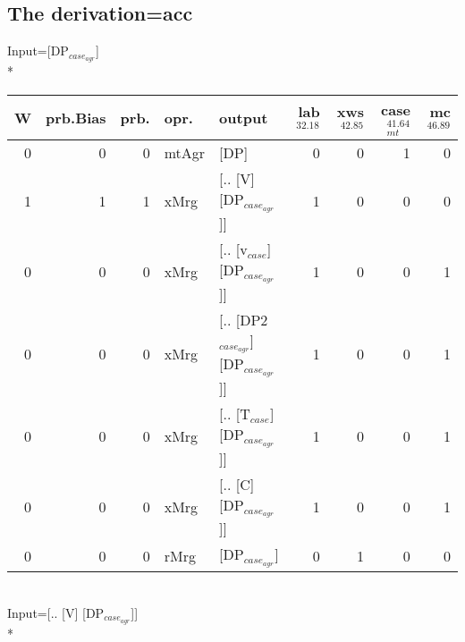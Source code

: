 \subsection{The derivation=acc}
\begingroup\scriptsize Input=[DP$_{case_{agr}}$]\\*
\begin{tabularx}{\linewidth}{rrrlXrrrr}
\hline
   W &   prb.Bias &   prb. & opr.    & output                            &   lab$^{32.18}$ &   xws$^{42.85}$ &   case$_{mt}^{41.64}$ &   mc$^{46.89}$ \\
\hline
   0 &       0 &   0 & mtAgr & [DP]                              &             0 &             0 &                 1 &            0 \\
   1 &       1 &   1 & xMrg  & [.. [V] [DP$_{case_{agr}}$]]            &             1 &             0 &                 0 &            0 \\
   0 &       0 &   0 & xMrg  & [.. [v$_{case}$] [DP$_{case_{agr}}$]]       &             1 &             0 &                 0 &            1 \\
   0 &       0 &   0 & xMrg  & [.. [DP2$_{case_{agr}}$] [DP$_{case_{agr}}$]] &             1 &             0 &                 0 &            1 \\
   0 &       0 &   0 & xMrg  & [.. [T$_{case}$] [DP$_{case_{agr}}$]]       &             1 &             0 &                 0 &            1 \\
   0 &       0 &   0 & xMrg  & [.. [C] [DP$_{case_{agr}}$]]            &             1 &             0 &                 0 &            1 \\
   0 &       0 &   0 & rMrg  & [DP$_{case_{agr}}$]                     &             0 &             1 &                 0 &            0 \\
\hline
\end{tabularx}\endgroup\\
\begingroup\scriptsize Input=[.. [V] [DP$_{case_{agr}}$]]\\*
